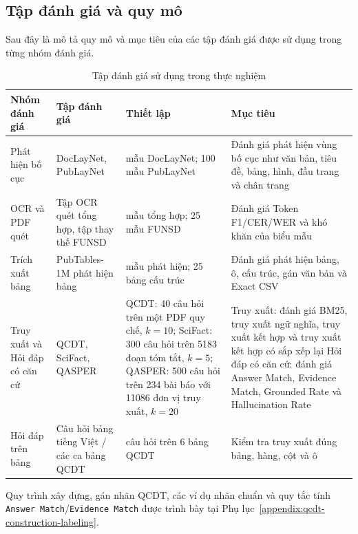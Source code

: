 \documentclass[../DoAn.tex]{subfiles}
\begin{document}
\subsection{Tập đánh giá và quy mô}
Sau đây là mô tả quy mô và mục tiêu của các tập đánh giá được sử dụng trong từng nhóm đánh giá.
\begin{table}[H]
\centering
\caption{Tập đánh giá sử dụng trong thực nghiệm}
\label{tab:evaluation-benchmarks}

\footnotesize
\begin{tabularx}{\textwidth}{|
>{\raggedright\arraybackslash}p{}|
>{\raggedright\arraybackslash}p{}|
>{\raggedright\arraybackslash}p{}|
>{\raggedright\arraybackslash}X|
}
\hline
\textbf{Nhóm đánh giá} & \textbf{Tập đánh giá} & \textbf{Thiết lập} & \textbf{Mục tiêu} \\
\hline

Phát hiện bố cục & DocLayNet, PubLayNet & 49 mẫu DocLayNet; 100 mẫu PubLayNet & Đánh giá phát hiện vùng bố cục như văn bản, tiêu đề, bảng, hình, đầu trang và chân trang \\
\hline
OCR và PDF quét & Tập OCR quét tổng hợp, tập thay thế FUNSD & 25 mẫu tổng hợp; 25 mẫu FUNSD & Đánh giá Token F1/CER/WER và khó khăn của biểu mẫu \\
\hline
Trích xuất bảng & PubTables-1M phát hiện bảng & 500 mẫu phát hiện; 25 bảng cấu trúc & Đánh giá phát hiện bảng, ô, cấu trúc, gán văn bản và Exact CSV \\
\hline
Truy xuất và Hỏi đáp có căn cứ & QCDT, SciFact, QASPER & QCDT: 40 câu hỏi trên một PDF quy chế, \(k=10\); \newline
SciFact: 300 câu hỏi trên 5183 đoạn tóm tắt, \(k=5\);\newline
QASPER: 500 câu hỏi trên 234 bài báo với 11086 đơn vị truy xuất, \(k=20\) & Truy xuất: đánh giá BM25, truy xuất ngữ nghĩa, truy xuất kết hợp và truy xuất kết hợp có sắp xếp lại \newline Hỏi đáp có căn cứ: đánh giá Answer Match, Evidence Match, Grounded Rate và Hallucination Rate \\
\hline
Hỏi đáp trên bảng & Câu hỏi bảng tiếng Việt / các ca bảng QCDT & 39 câu hỏi trên 6 bảng QCDT & Kiểm tra truy xuất đúng bảng, hàng, cột và ô \\
\hline
\end{tabularx}
\end{table}

Quy trình xây dựng, gán nhãn QCDT, các ví dụ nhãn chuẩn và quy tắc tính
\texttt{Answer Match}/\texttt{Evidence Match} được trình bày tại
Phụ lục~\ref{appendix:qcdt-construction-labeling}.
\end{document}
